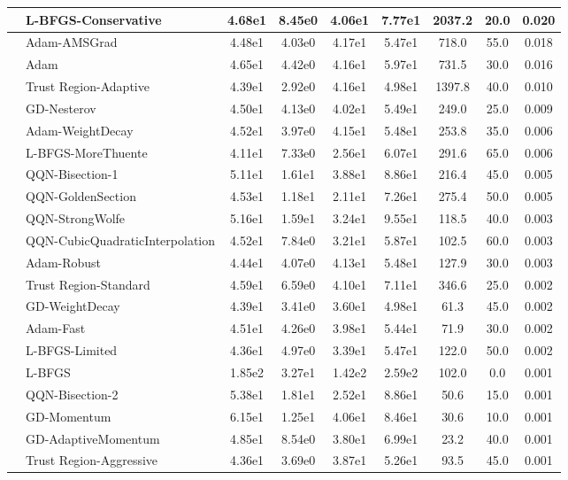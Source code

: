 \documentclass{article}
\begin{document}
\begin{longtable}{|l|l|c|c|c|c|c|c|c|}
\hline
 & L-BFGS-Conservative & 4.68e1 & 8.45e0 & 4.06e1 & 7.77e1 & 2037.2 & 20.0 & 0.020 \\
\hline
 & Adam-AMSGrad & 4.48e1 & 4.03e0 & 4.17e1 & 5.47e1 & 718.0 & 55.0 & 0.018 \\
\hline
 & Adam & 4.65e1 & 4.42e0 & 4.16e1 & 5.97e1 & 731.5 & 30.0 & 0.016 \\
\hline
 & Trust Region-Adaptive & 4.39e1 & 2.92e0 & 4.16e1 & 4.98e1 & 1397.8 & 40.0 & 0.010 \\
\hline
 & GD-Nesterov & 4.50e1 & 4.13e0 & 4.02e1 & 5.49e1 & 249.0 & 25.0 & 0.009 \\
\hline
 & Adam-WeightDecay & 4.52e1 & 3.97e0 & 4.15e1 & 5.48e1 & 253.8 & 35.0 & 0.006 \\
\hline
 & L-BFGS-MoreThuente & 4.11e1 & 7.33e0 & 2.56e1 & 6.07e1 & 291.6 & 65.0 & 0.006 \\
\hline
 & QQN-Bisection-1 & 5.11e1 & 1.61e1 & 3.88e1 & 8.86e1 & 216.4 & 45.0 & 0.005 \\
\hline
 & QQN-GoldenSection & 4.53e1 & 1.18e1 & 2.11e1 & 7.26e1 & 275.4 & 50.0 & 0.005 \\
\hline
 & QQN-StrongWolfe & 5.16e1 & 1.59e1 & 3.24e1 & 9.55e1 & 118.5 & 40.0 & 0.003 \\
\hline
 & QQN-CubicQuadraticInterpolation & 4.52e1 & 7.84e0 & 3.21e1 & 5.87e1 & 102.5 & 60.0 & 0.003 \\
\hline
 & Adam-Robust & 4.44e1 & 4.07e0 & 4.13e1 & 5.48e1 & 127.9 & 30.0 & 0.003 \\
\hline
 & Trust Region-Standard & 4.59e1 & 6.59e0 & 4.10e1 & 7.11e1 & 346.6 & 25.0 & 0.002 \\
\hline
 & GD-WeightDecay & 4.39e1 & 3.41e0 & 3.60e1 & 4.98e1 & 61.3 & 45.0 & 0.002 \\
\hline
 & Adam-Fast & 4.51e1 & 4.26e0 & 3.98e1 & 5.44e1 & 71.9 & 30.0 & 0.002 \\
\hline
 & L-BFGS-Limited & 4.36e1 & 4.97e0 & 3.39e1 & 5.47e1 & 122.0 & 50.0 & 0.002 \\
\hline
 & L-BFGS & 1.85e2 & 3.27e1 & 1.42e2 & 2.59e2 & 102.0 & 0.0 & 0.001 \\
\hline
 & QQN-Bisection-2 & 5.38e1 & 1.81e1 & 2.52e1 & 8.86e1 & 50.6 & 15.0 & 0.001 \\
\hline
 & GD-Momentum & 6.15e1 & 1.25e1 & 4.06e1 & 8.46e1 & 30.6 & 10.0 & 0.001 \\
\hline
 & GD-AdaptiveMomentum & 4.85e1 & 8.54e0 & 3.80e1 & 6.99e1 & 23.2 & 40.0 & 0.001 \\
\hline
 & Trust Region-Aggressive & 4.36e1 & 3.69e0 & 3.87e1 & 5.26e1 & 93.5 & 45.0 & 0.001 \\

\end{longtable}
\end{document}
